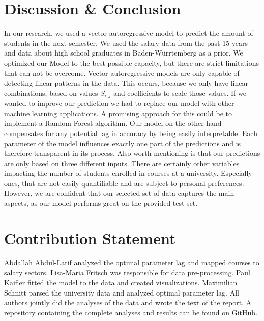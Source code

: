 \documentclass{article}
\theoremstyle{plain}
\theoremstyle{definition}
\theoremstyle{remark}
\begin{document}
\section{Discussion \& Conclusion}\label{sec:conclusion}
In our research, we used a vector autoregressive model to predict the amount of students in the next semester. 
We used the salary data from the past 15 years and data about high school graduates in Baden-Würrtemberg as a prior. We optimized our Model to the best
possible capacity,
but there are strict limitations that can not be overcome. Vector autoregressive models are only capable of detecting linear patterns in the data.
This occurs, because we only have linear combinations, based on values $S_{i,j}$ and coefficients to scale those values. If we wanted to improve
our prediction we had to replace our model with other machine learning applications.
A promising approach for this could be to implement a Random Forest algorithm.
Our model on the other hand compensates for any potential lag in accuracy by being easily interpretable. Each parameter of the model influences exactly
one part of the predictions and is therefore transparent in its process.
Also worth mentioning is that our predictions are only based on three different inputs. There are certainly other 
variables impacting the number of students enrolled in courses at a university. Especially ones, that are not easily quantifiable and are subject to
personal preferences. However, we are confident that our selected set of data captures the main aspects, as our model performs great on the provided test set.



\section*{Contribution Statement}
Abdallah Abdul-Latif analyzed the optimal parameter lag and mapped courses to salary sectors.
Lisa-Maria Fritsch was responsible for data pre-processing.
Paul Kaifler fitted the model to the data and created visualizations.
Maximilian Schnitt parsed the university data and analyzed optimal parameter lag.
All authors jointly did the analyses of the data and wrote the text of the report.
A repository containing the complete analyses and results can be found on \href{https://github.com/mxs01/AnalysingStudentDevelopment}{GitHub}.





\end{document}
